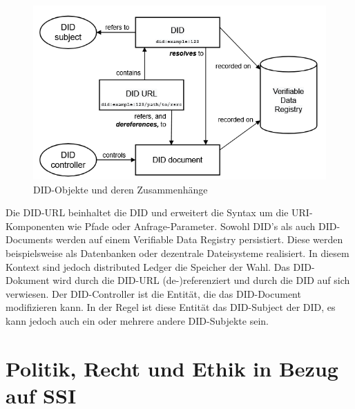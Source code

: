 \begin{figure}[H]
	\centering
	\includegraphics[scale=0.9]{media/DID.PNG}
	\caption{DID-Objekte und deren Zusammenhänge \cite{ID18}}
	\label{fig:meine-grafik}
\end{figure}

Die DID-URL beinhaltet die DID und erweitert die Syntax um die URI-Komponenten wie Pfade oder Anfrage-Parameter. Sowohl DID's als auch DID-Documents werden auf einem Verifiable Data Registry persistiert. Diese werden beispielsweise als Datenbanken oder dezentrale Dateisysteme realisiert. In diesem Kontext sind jedoch distributed Ledger die Speicher der Wahl. Das DID-Dokument wird durch die DID-URL (de-)referenziert und durch die DID auf sich verwiesen. Der DID-Controller ist die Entität, die das DID-Document modifizieren kann. In der Regel ist diese Entität das DID-Subject der DID, es kann jedoch auch
 ein oder mehrere andere DID-Subjekte sein.


\section{Politik, Recht und Ethik in Bezug auf SSI}

